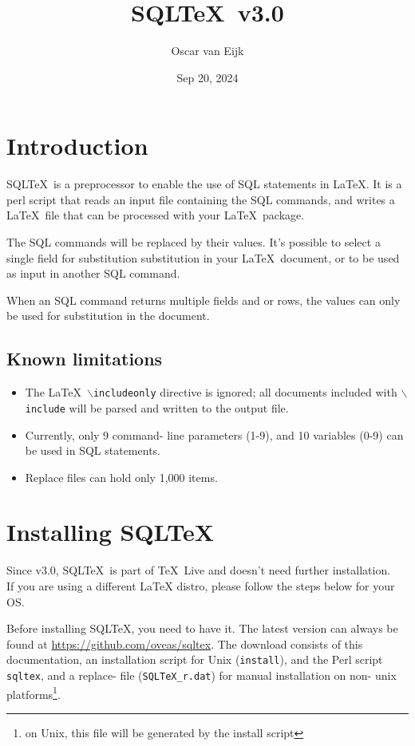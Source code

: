 \documentclass{article}
\newcommand{\bs}{\ensuremath{\backslash}}
\newcommand{\sqltexversion}{3.0}
\begin{document}
\title{SQL\TeX\ v\sqltexversion}
\date{Sep 20, 2024}
\author{Oscar van Eijk}
\maketitle
\hrulefill
\tableofcontents
\hrulefill

\section{Introduction}

SQL\TeX\ is a preprocessor to enable the use of SQL statements in \LaTeX. It is a perl script that reads
an input file containing the SQL commands, and writes a \LaTeX\ file that can be processed with your
\LaTeX\ package.

The SQL commands will be replaced by their values. It's possible to select a single field for substitution
substitution in your \LaTeX\ document, or to be used as input in another SQL command.

When an SQL command returns multiple fields and or rows, the values can only be used for substitution
in the document.

\subsection{Known limitations}

\begin{itemize}
\item The \LaTeX\ \texttt{\bs includeonly} directive is ignored; all documents included with \texttt{\bs include} will be parsed and written to the output file.
\item Currently, only 9 command- line parameters (1-9), and 10 variables (0-9) can be used in SQL statements.
\item Replace files can hold only 1,000 items.
\end{itemize}

\section{Installing SQL\TeX}

Since v3.0, SQL\TeX\ is part of \TeX\ Live and doesn't need further installation. \\
If you are using a different LaTeX distro, please follow the steps below for your OS.

Before installing SQL\TeX, you need to have it. The latest version can always be found at
\url{https://github.com/oveas/sqltex}.
The download consists of this do\-cumentation, an installation script for Unix
(\texttt{install}), and the Perl script \texttt{sqltex}, and a replace- file (\texttt{SQLTeX\_r.dat}) for manual installation
on non- unix platforms\footnote{on Unix, this file will be generated by the install script}.
\end{document}
